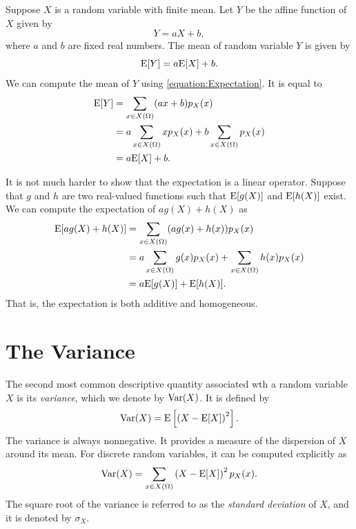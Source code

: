 Suppose $X$ is a random variable with finite mean.
Let $Y$ be the affine function of $X$ given by
\begin{equation*}
Y = aX + b,
\end{equation*}
where $a$ and $b$ are fixed real numbers.
The mean of random variable $Y$ is given by
\begin{equation*}
\mathrm{E} [Y] = a \mathrm{E} [X] + b.
\end{equation*}
We can compute the mean of $Y$ using \eqref{equation:Expectation}.
It is equal to
\begin{equation*}
\begin{split}
\mathrm{E} [Y] &= \sum_{x \in X(\Omega)} (ax + b) p_X(x) \\
&= a \sum_{x \in X(\Omega)} x p_X(x) + b \sum_{x \in X(\Omega)} p_X(x) \\
&= a \mathrm{E} [X] + b.
\end{split}
\end{equation*}

It is not much harder to show that the expectation is a linear operator.
Suppose that $g$ and $h$ are two real-valued functions such that $\mathrm{E} [g(X)]$ and $\mathrm{E} [h(X)]$ exist.
We can compute the expectation of $a g(X) + h(X)$ as
\begin{equation*}
\begin{split}
\mathrm{E} [ a g(X) + h(X) ] &= \sum_{x \in X(\Omega)} (a g(x) + h(x)) p_X(x) \\
&= a \sum_{x \in X(\Omega)} g(x) p_X(x) + \sum_{x \in X(\Omega)} h(x) p_X(x) \\
&= a \mathrm{E} [g(X)] + \mathrm{E} [h(X)] .
\end{split}
\end{equation*}
That is, the expectation is both additive and homogeneous.


\section{The Variance}

The second most common descriptive quantity associated wth a random variable $X$ is its \emph{variance}, which we denote by $\mathrm{Var} (X)$.
It is defined by
\begin{equation} \label{equation:Variance}
\mathrm{Var} (X) = \mathrm{E} \left[ \left( X - \mathrm{E} [X] \right)^2 \right] .
\end{equation}
The variance is always nonnegative.
It provides a measure of the dispersion of $X$ around its mean.
For discrete random variables, it can be computed explicitly as
\begin{equation*}
\mathrm{Var} (X) = \sum_{x \in X(\Omega)} \left( X - \mathrm{E} [X] \right)^2 p_X (x) .
\end{equation*}
The square root of the variance is referred to as the \emph{standard deviation} of $X$, and it is denoted by $\sigma_X$.

